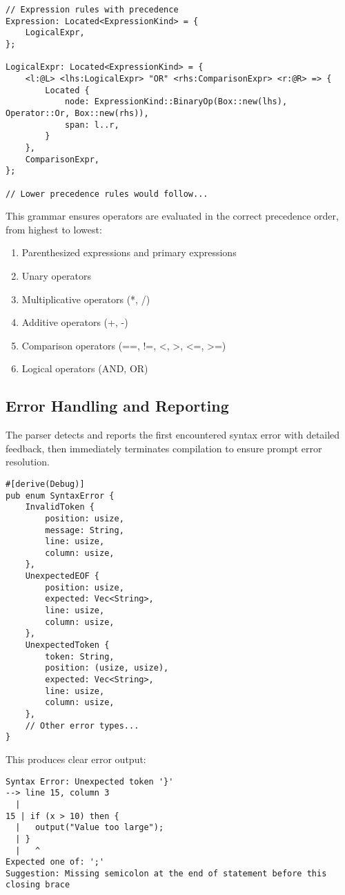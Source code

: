 \documentclass[12pt,a4paper]{article}
\begin{document}
\begin{lstlisting}[caption={Expression Grammar Example}]
// Expression rules with precedence
Expression: Located<ExpressionKind> = {
    LogicalExpr,
};

LogicalExpr: Located<ExpressionKind> = {
    <l:@L> <lhs:LogicalExpr> "OR" <rhs:ComparisonExpr> <r:@R> => {
        Located {
            node: ExpressionKind::BinaryOp(Box::new(lhs), Operator::Or, Box::new(rhs)),
            span: l..r,
        }
    },
    ComparisonExpr,
};

// Lower precedence rules would follow...
\end{lstlisting}

This grammar ensures operators are evaluated in the correct precedence order, from highest to lowest:
\begin{enumerate}
	\item Parenthesized expressions and primary expressions
	\item Unary operators
	\item Multiplicative operators (*, /)
	\item Additive operators (+, -)
	\item Comparison operators (==, !=, <, >, <=, >=)
	\item Logical operators (AND, OR)
\end{enumerate}

\subsection{Error Handling and Reporting}
The parser detects and reports the first encountered syntax error with detailed feedback, then immediately terminates compilation to ensure prompt error resolution.
\begin{lstlisting}[caption={Syntax Error Types}]
#[derive(Debug)]
pub enum SyntaxError {
    InvalidToken {
        position: usize,
        message: String,
        line: usize,
        column: usize,
    },
    UnexpectedEOF {
        position: usize,
        expected: Vec<String>,
        line: usize,
        column: usize,
    },
    UnexpectedToken {
        token: String,
        position: (usize, usize),
        expected: Vec<String>,
        line: usize,
        column: usize,
    },
    // Other error types...
}
\end{lstlisting}

This produces clear error output:

\begin{lstlisting}[caption={Syntax Error Output}]
Syntax Error: Unexpected token '}'
--> line 15, column 3
  |
15 | if (x > 10) then {
  |   output("Value too large");
  | }
  |   ^
Expected one of: ';'
Suggestion: Missing semicolon at the end of statement before this closing brace
\end{lstlisting}
\end{document}
